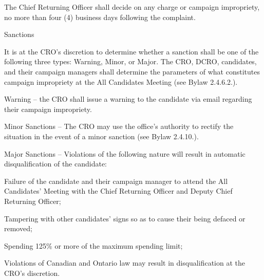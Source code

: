 \begin{longenum}[ label*=\thesection.\arabic*., align=left]
\begin{longenum}[label*=\arabic*., align=left]
\item The Chief Returning Officer shall decide on any charge or campaign impropriety, no more than four (4) business days following the complaint.
\item Sanctions
	\begin{longenum}[label*=\arabic*., align=left]
\item It is at the CRO's discretion to determine whether a sanction shall be one of the following three types: Warning, Minor, or Major. The CRO, DCRO, candidates, and their campaign managers shall determine the parameters of what constitutes campaign impropriety at the All Candidates Meeting (see Bylaw 2.4.6.2.).
\item Warning – the CRO shall issue a warning to the candidate via email regarding their campaign impropriety.
\item Minor Sanctions – The CRO may use the office's authority to rectify the situation in the event of a minor sanction (see Bylaw 2.4.10.).
\item Major Sanctions – Violations of the following nature will result in automatic disqualification of the candidate:
	\begin{longenum}[label*=\arabic*., align=left]
\item Failure of the candidate and their campaign manager to attend the All Candidates' Meeting with the Chief Returning Officer and Deputy Chief Returning Officer;
\item Tampering with other candidates' signs so as to cause their being defaced or removed;
\item Spending 125\% or more of the maximum spending limit;
\item Violations of Canadian and Ontario law may result in disqualification at the CRO's discretion.
\end{longenum}
\end{longenum}
 \end{longenum}
 

\end{longenum}
